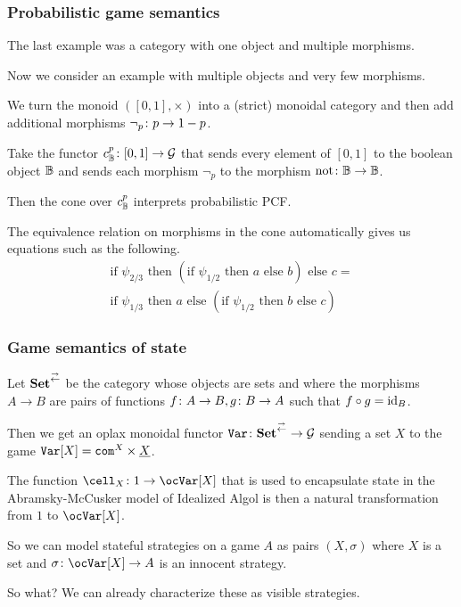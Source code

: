 \documentclass{beamer}
\begin{document}
\begin{frame}
  \frametitle{Probabilistic game semantics}
  The last example was a category with one object and multiple morphisms.
  \pause

  Now we consider an example with multiple objects and very few morphisms.
  \pause

  We turn the monoid $([0,1],\times)$ into a (strict) monoidal category and then add additional morphisms $\neg_p\colon p \to 1-p$.  
  
  Take the functor $c_{\mathbb{B}}^p\colon [0,1]\to \mathcal G$ that sends every element of $[0,1]$ to the boolean object $\mathbb{B}$ and sends each morphism $\neg_p$ to the morphism $\text{not}\colon\mathbb{B}\to\mathbb{B}$.
  \pause

  Then the cone over $c_{\mathbb{B}}^p$ interprets probabilistic PCF.
  \pause

  The equivalence relation on morphisms in the cone automatically gives us equations such as the following.
  \begin{gather*}
    \text{if }\psi_{2/3}\text{ then }(\text{if }\psi_{1/2}\text{ then }a\text{ else }b)\text{ else }c=\\
    \text{if }\psi_{1/3}\text{ then }a\text{ else }(\text{if }\psi_{1/2}\text{ then }b\text{ else }c)
  \end{gather*}
\end{frame}

\begin{frame}
  \frametitle{Game semantics of state}
  Let ${\normalfont\textbf{Set}}^{\overset{\rightarrow}{\leftarrow}}$ be the category whose objects are sets and where the morphisms $A\to B$ are pairs of functions $f\colon A\to B,g\colon B\to A$ such that $f\circ g=\operatorname{id}_B$.

  Then we get an oplax monoidal functor ${\mathtt{Var}}\colon{\normalfont\textbf{Set}}^{\overset{\rightarrow}{\leftarrow}}\to\mathcal G$ sending a set $X$ to the game ${\mathtt{Var}}[X] = {\mathtt{com}}^X\times \underline X$.
  \pause

  The function $\cell_X\from 1 \to \oc\Var[X]$ that is used to encapsulate state in the Abramsky-McCusker model of Idealized Algol is then a natural transformation from $1$ to $\oc\Var[X]$.
  \pause

  So we can model stateful strategies on a game $A$ as pairs $(X,\sigma)$ where $X$ is a set and $\sigma\from\oc\Var[X]\to A$ is an innocent strategy.
  \pause

  So what?  We can already characterize these as visible strategies.
\end{frame}
\end{document}
